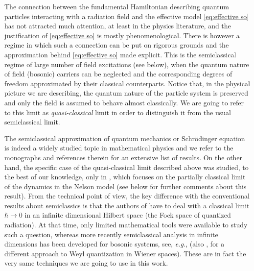 \documentclass[11pt,a4paper,reqno]{amsart}
\theoremstyle{definition}
\numberwithin{equation}{section}
\begin{document}
The connection between the fundamental Hamiltonian describing quantum particles interacting with a radiation field and the effective model \eqref{eq:effective so} has not attracted much attention, at least in the physics literature, and the justification of \eqref{eq:effective so} is mostly phenomenological. There is however a regime in which such a connection can be put on rigorous grounds and the approximation behind \eqref{eq:effective so} made explicit. This is the semiclassical regime of large number of field excitations (see below), when the quantum nature of field (bosonic) carriers can be neglected and the corresponding degrees of freedom approximated by their classical counterparts. Notice that, in the physical picture we are describing, the quantum nature of the particle system is preserved and only the field is assumed to behave almost classically. We are going to refer to this limit as {\it quasi-classical} limit in order to distinguish it from the usual semiclassical limit. 

The semiclassical approximation of quantum mechanics or Schr\"{o}dinger equation is indeed a widely studied
topic in mathematical physics and we refer to the monographs \cite{Hel1988,Zwo2012} and references therein for
an extensive list of results. On the other hand, the specific case of the quasi-classical limit described
above was studied, to the best of our knowledge, only in \cite{MR2205462}, which focuses on the partially
classical limit of the dynamics in the Nelson model (see below for further comments about this result). From
the technical point of view, the key difference with the conventional results about semiclassics is that the
authors of \cite{MR2205462} have to deal with a classical limit $ \hbar \to 0 $ in an infinite dimensional
Hilbert space (the Fock space of quantized radiation). At that time, only limited mathematical tools were
available to study such a question, whereas more recently semiclassical analysis in infinite dimensions has
been developed for bosonic systems, see, \emph{e.g.}, \cite{ammari:nier:2008,
  MR2513969,Ammari:2014aa,Falconi:2016ab} (also \cite{AJN2015,AN2015}, for a different approach to Weyl
quantization in Wiener spaces). These are in fact the very same techniques we are going to use in this work.
\end{document}
